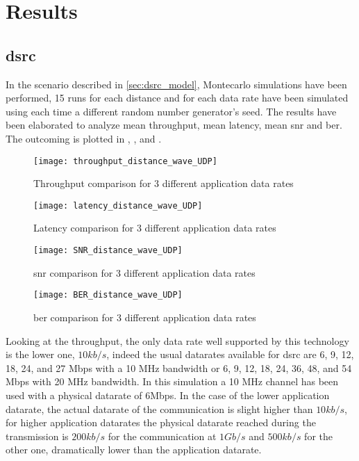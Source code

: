 
\section{Results}
\label{sec:results}

\subsection{\gls{dsrc}}

In the scenario described in \ref{sec:dsrc_model}, Montecarlo simulations have been performed, 15 runs for each distance and for each data rate have been simulated using each time a different random number generator's seed. The results have been elaborated to analyze mean throughput, mean latency, mean \gls{snr} and \gls{ber}.
The outcoming is plotted in , ,  and .

\begin{figure}[ht]
  \texttt{[image: throughput\_distance\_wave\_UDP]}
  \caption{Throughput comparison for 3 different application data rates}
  \label{fig:dsrc-throughput}
\end{figure}

\begin{figure}[ht]
  \texttt{[image: latency\_distance\_wave\_UDP]}
  \caption{Latency comparison for 3 different application data rates}
  \label{fig:dsrc-latency}
\end{figure}

\begin{figure}[ht]
  \texttt{[image: SNR\_distance\_wave\_UDP]}
  \caption{\gls{snr} comparison for 3 different application data rates}
  \label{fig:dsrc-SNR}
\end{figure}

\begin{figure}[ht]
  \texttt{[image: BER\_distance\_wave\_UDP]}
  \caption{\gls{ber} comparison for 3 different application data rates}
  \label{fig:dsrc-BER}
\end{figure}

Looking at the throughput, the only data rate well supported by this technology is the lower one, $10kb/s$, indeed the usual datarates available for \gls{dsrc} are 6, 9, 12, 18, 24, and 27 Mbps with a 10 MHz bandwidth or 6, 9, 12, 18, 24, 36, 48, and 54 Mbps with 20 MHz bandwidth. 
In this simulation a 10 MHz channel has been used with a physical datarate of 6Mbps.
In the case of the lower application datarate, the actual datarate of the communication is slight higher than $10kb/s$, for higher application datarates the physical datarate reached during the transmission is $200kb/s$ for the communication at $1Gb/s$ and $500kb/s$ for the other one, dramatically lower than the application datarate.


